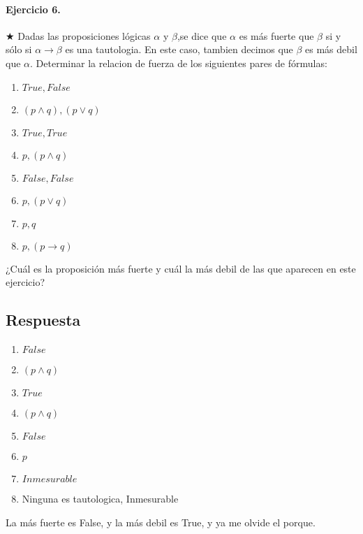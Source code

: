 \documentclass[a4paper]{article}
\begin{document}
\paragraph{\textbf{Ejercicio 6.}} $\bigstar$ Dadas las proposiciones lógicas $\alpha$ y $\beta$,se dice que $\alpha$ es más fuerte que $\beta$ si y sólo si $\alpha \rightarrow \beta$ es una tautologia. En este caso, tambien decimos que $\beta$ es más debil que $\alpha$. Determinar la relacion de fuerza de los siguientes pares de fórmulas:

\begin{multicols}{2}
\begin{enumerate}[label=\alph*)]
\item $ True,False$
\item $ (p \wedge q),(p \vee q) $
\item $ True,True$
\item $ p,(p \wedge q)$
\item $ False,False $ 
\item $ p,(p \vee q) $
\item $ p,q$
\item $ p,(p \rightarrow q)$          
\end{enumerate}
\end{multicols}

¿Cuál es la proposición más fuerte y cuál la más debil de las que aparecen en este ejercicio?

\subsection*{Respuesta}

\begin{multicols}{2}
\begin{enumerate}[label=\alph*)]
\item $ False$
\item $ (p \wedge q)$
\item $ True$
\item $ (p \wedge q)$
\item $ False $ 
\item $ p $
\item $ Inmesurable$
\item Ninguna es tautologica, Inmesurable               
\end{enumerate}
\end{multicols}

La más fuerte es False, y la más debil es True, y ya me olvide el porque.
\end{document}
